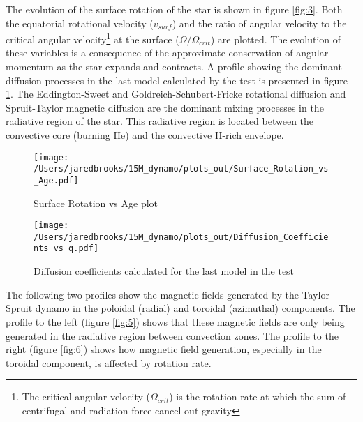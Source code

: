 \documentclass{article}
\begin{document}
        \pagebreak

        The evolution of the surface rotation of the star is shown in figure \ref{fig:3}. Both the equatorial rotational velocity ($v_{surf}$) and the ratio of angular velocity to the critical angular velocity\footnote{The critical angular velocity ($\Omega_{crit}$) is the rotation rate at which the sum of centrifugal and radiation force cancel out gravity} at the surface ($\Omega/\Omega_{crit}$) are plotted.  The evolution of these variables is a consequence of the approximate conservation of angular momentum as the star expands and contracts.  A profile showing the dominant diffusion processes in the last  model calculated by the test is presented in figure \ref{fig:4}. The Eddington-Sweet and Goldreich-Schubert-Fricke rotational diffusion and Spruit-Taylor magnetic diffusion are the dominant mixing processes in the radiative region of the star. This radiative region is located between the convective core (burning He) and the convective H-rich envelope. 

        \begin{figure}[H]
                \begin{minipage}[b]{0.5\linewidth}
                       \centering
                       \texttt{[image: /Users/jaredbrooks/15M\_dynamo/plots\_out/Surface\_Rotation\_vs\_Age.pdf]}
                       \caption{Surface Rotation vs Age plot}
                       \label{fig:3}
                \end{minipage}
                \hspace{0cm}
                \begin{minipage}[b]{0.5\linewidth}
                       \centering
                       \texttt{[image: /Users/jaredbrooks/15M\_dynamo/plots\_out/Diffusion\_Coefficients\_vs\_q.pdf]}
                       \caption{Diffusion coefficients calculated for the last model in the test}
                       \label{fig:4}
                \end{minipage}
        \end{figure}

        \pagebreak

        The following two profiles show the magnetic fields generated by the Taylor-Spruit dynamo in the poloidal (radial) and toroidal (azimuthal) components.  The profile to the left (figure \ref{fig:5}) shows that these magnetic fields are only being generated in the radiative region between convection zones.  The profile to the right (figure \ref{fig:6}) shows how magnetic field generation, especially in the toroidal component, is affected by rotation rate.
\end{document}
